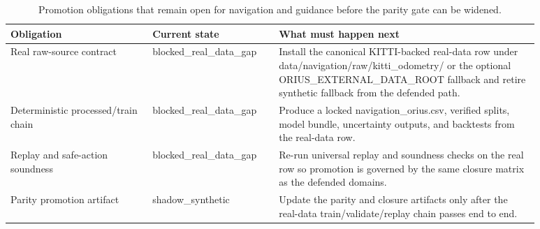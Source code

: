 \begin{table}[htbp]
\centering
\small
\caption{Promotion obligations that remain open for navigation and guidance before the parity gate can be widened.}
\label{tab:navigation-promotion-obligations}
\begin{tabular}{p{0.24\linewidth}p{0.20\linewidth}p{0.44\linewidth}}
\toprule
\textbf{Obligation} & \textbf{Current state} & \textbf{What must happen next}\\
\midrule
Real raw-source contract & blocked\_real\_data\_gap & Install the canonical KITTI-backed real-data row under data/navigation/raw/kitti\_odometry/ or the optional ORIUS\_EXTERNAL\_DATA\_ROOT fallback and retire synthetic fallback from the defended path.\\
Deterministic processed/train chain & blocked\_real\_data\_gap & Produce a locked navigation\_orius.csv, verified splits, model bundle, uncertainty outputs, and backtests from the real-data row.\\
Replay and safe-action soundness & blocked\_real\_data\_gap & Re-run universal replay and soundness checks on the real row so promotion is governed by the same closure matrix as the defended domains.\\
Parity promotion artifact & shadow\_synthetic & Update the parity and closure artifacts only after the real-data train/validate/replay chain passes end to end.\\
\bottomrule
\end{tabular}
\end{table}
